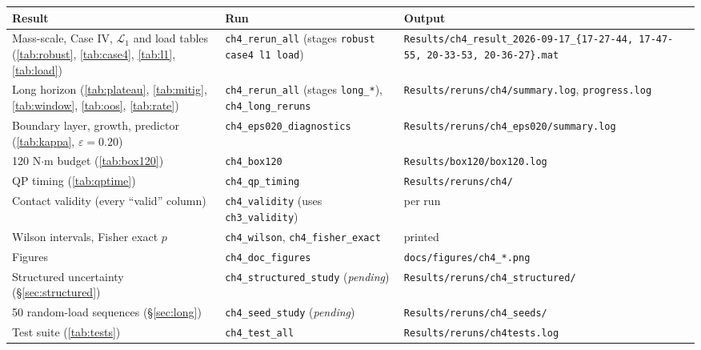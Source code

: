\documentclass[10pt,twocolumn]{article}
\begin{document}
\begin{latin}
\footnotesize
\setlength{\tabcolsep}{4pt}
\begin{tabular}{p{}p{}p{}}
    \toprule
    Result & Run & Output \\
    \midrule
    Mass-scale, Case IV, $\mathcal{L}_1$ and load tables
        (\ref{tab:robust}, \ref{tab:case4}, \ref{tab:l1}, \ref{tab:load}) &
        \texttt{ch4\_rerun\_all} (stages \texttt{robust case4 l1 load}) &
        \texttt{Results/ch4\_result\_2026-09-17\_\{17-27-44, 17-47-55, 20-33-53, 20-36-27\}.mat} \\
    Long horizon (\ref{tab:plateau}, \ref{tab:mitig}, \ref{tab:window}, \ref{tab:oos}, \ref{tab:rate}) &
        \texttt{ch4\_rerun\_all} (stages \texttt{long\_*}), \texttt{ch4\_long\_reruns} &
        \texttt{Results/reruns/ch4/summary.log}, \texttt{progress.log} \\
    Boundary layer, growth, predictor (\ref{tab:kappa}, $\varepsilon=0.20$) &
        \texttt{ch4\_eps020\_diagnostics} & \texttt{Results/reruns/ch4\_eps020/summary.log} \\
    120 N$\cdot$m budget (\ref{tab:box120}) &
        \texttt{ch4\_box120} & \texttt{Results/box120/box120.log} \\
    QP timing (\ref{tab:qptime}) &
        \texttt{ch4\_qp\_timing} & \texttt{Results/reruns/ch4/} \\
    Contact validity (every ``valid'' column) &
        \texttt{ch4\_validity} (uses \texttt{ch3\_validity}) & per run \\
    Wilson intervals, Fisher exact $p$ &
        \texttt{ch4\_wilson}, \texttt{ch4\_fisher\_exact} & printed \\
    Figures &
        \texttt{ch4\_doc\_figures} & \texttt{docs/figures/ch4\_*.png} \\
    Structured uncertainty (\S\ref{sec:structured}) &
        \texttt{ch4\_structured\_study} (\emph{pending}) & \texttt{Results/reruns/ch4\_structured/} \\
    50 random-load sequences (\S\ref{sec:long}) &
        \texttt{ch4\_seed\_study} (\emph{pending}) & \texttt{Results/reruns/ch4\_seeds/} \\
    Test suite (\ref{tab:tests}) &
        \texttt{ch4\_test\_all} & \texttt{Results/reruns/ch4tests.log} \\
    \bottomrule
\end{tabular}
\end{latin}
\end{document}
